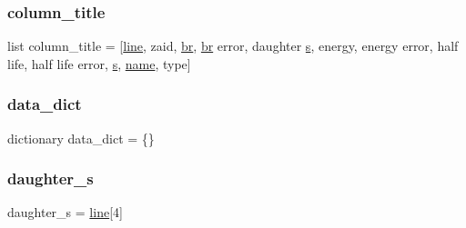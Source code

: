 \subsubsection{\texorpdfstring{column\+\_\+title}{column\_title}}
{\footnotesize\ttfamily list column\+\_\+title = \mbox{[}\textquotesingle{}\mbox{\hyperlink{namespaceconv__nndc__decaylib_a4fa05b1f00fcde100685cc887554b93b}{line}}\textquotesingle{}, \textquotesingle{}zaid\textquotesingle{}, \textquotesingle{}\mbox{\hyperlink{namespaceconv__nndc__decaylib_a88f0860257ba6bdc089557444f5cdd16}{br}}\textquotesingle{}, \textquotesingle{}\mbox{\hyperlink{namespaceconv__nndc__decaylib_a88f0860257ba6bdc089557444f5cdd16}{br}} error\textquotesingle{}, \textquotesingle{}daughter \mbox{\hyperlink{namespaceconv__nndc__decaylib_a3691308f2a4c2f6983f2880d32e29c84}{s}}\textquotesingle{}, \textquotesingle{}energy\textquotesingle{}, \textquotesingle{}energy error\textquotesingle{}, \textquotesingle{}half life\textquotesingle{}, \textquotesingle{}half life error\textquotesingle{}, \textquotesingle{}\mbox{\hyperlink{namespaceconv__nndc__decaylib_a3691308f2a4c2f6983f2880d32e29c84}{s}}\textquotesingle{}, \textquotesingle{}\mbox{\hyperlink{namespaceconv__nndc__decaylib_ab74e6bf80237ddc4109968cedc58c151}{name}}\textquotesingle{}, \textquotesingle{}type\textquotesingle{}\mbox{]}}

\mbox{\label{namespaceconv__nndc__decaylib_a062544a43938c2acb10e4e257e10f99a}} 
\subsubsection{\texorpdfstring{data\+\_\+dict}{data\_dict}}
{\footnotesize\ttfamily dictionary data\+\_\+dict = \{\}}

\mbox{\label{namespaceconv__nndc__decaylib_adda3bec279271cf11096d3fd91c959df}} 
\subsubsection{\texorpdfstring{daughter\+\_\+s}{daughter\_s}}
{\footnotesize\ttfamily daughter\+\_\+s = \mbox{\hyperlink{namespaceconv__nndc__decaylib_a4fa05b1f00fcde100685cc887554b93b}{line}}\mbox{[}4\mbox{]}}

